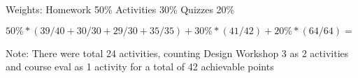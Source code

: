 Weights:
Homework 50\%
Activities 30\%
Quizzes 20\%

$50\% * (39/40 + 30/30 + 29/30 + 35/35) + 30\% * (41/42) + 20\% * (64/64) = $

Note: There were total 24 activities, counting Design Workshop 3 as 2 activities and course eval as 1 activity for a total of 42 achievable points
